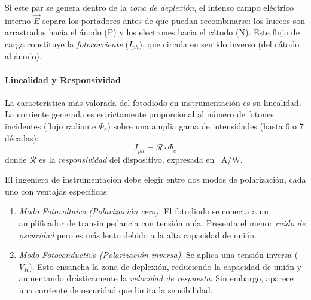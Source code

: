 Si este par se genera dentro de la \emph{zona de deplexión}, el intenso campo eléctrico interno $\vec{E}$ separa los portadores antes de que puedan recombinarse: los huecos son arrastrados hacia el ánodo (P) y los electrones hacia el cátodo (N). Este flujo de carga constituye la \emph{fotocorriente} ($I_{ph}$), que circula en sentido inverso (del cátodo al ánodo).


\paragraph{Linealidad y Responsividad}
La característica más valorada del fotodiodo en instrumentación es su linealidad. La corriente generada es estrictamente proporcional al número de fotones incidentes (flujo radiante $\Phi_e$) sobre una amplia gama de intensidades (hasta 6 o 7 décadas):
\begin{equation}\label{eq:responsividad}
    I_{ph} = \mathcal{R} \cdot \Phi_e
\end{equation}
donde $\mathcal{R}$ es la \emph{responsividad} del dispositivo, expresada en \qty{}{A/W}. 


El ingeniero de instrumentación debe elegir entre dos modos de polarización, cada uno con ventajas específicas:

\begin{enumerate}
    \item \emph{Modo Fotovoltaico (Polarización cero)}: El fotodiodo se conecta a un amplificador de transimpedancia con tensión nula. Presenta el menor \emph{ruido de oscuridad} pero es más lento debido a la alta capacidad de unión.
    \item \emph{Modo Fotoconductivo (Polarización inversa)}: Se aplica una tensión inversa ($V_R$). Esto ensancha la zona de deplexión, reduciendo la capacidad de unión y aumentando drásticamente la \emph{velocidad de respuesta}. Sin embargo, aparece una corriente de oscuridad que limita la sensibilidad.
\end{enumerate}


